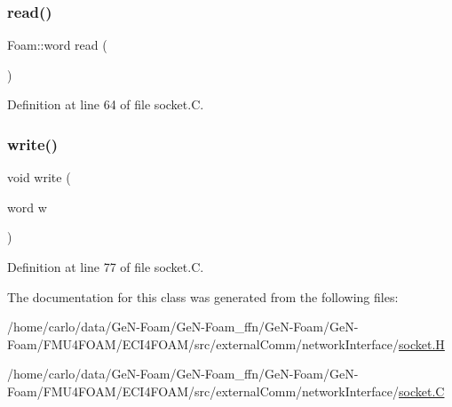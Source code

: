 \subsubsection{\texorpdfstring{read()}{read()}}
{\footnotesize\ttfamily Foam\+::word read (\begin{DoxyParamCaption}{ }\end{DoxyParamCaption})}



Definition at line 64 of file socket.\+C.

\mbox{\label{classFoam_1_1socket_a5abf104fabb38aa7c80721483091cf0b}} 
\subsubsection{\texorpdfstring{write()}{write()}}
{\footnotesize\ttfamily void write (\begin{DoxyParamCaption}\item[{word}]{w }\end{DoxyParamCaption})}



Definition at line 77 of file socket.\+C.



The documentation for this class was generated from the following files\+:\begin{DoxyCompactItemize}
\item 
/home/carlo/data/\+Ge\+N-\/\+Foam/\+Ge\+N-\/\+Foam\+\_\+ffn/\+Ge\+N-\/\+Foam/\+Ge\+N-\/\+Foam/\+F\+M\+U4\+F\+O\+A\+M/\+E\+C\+I4\+F\+O\+A\+M/src/external\+Comm/network\+Interface/\hyperlink{socket_8H}{socket.\+H}\item 
/home/carlo/data/\+Ge\+N-\/\+Foam/\+Ge\+N-\/\+Foam\+\_\+ffn/\+Ge\+N-\/\+Foam/\+Ge\+N-\/\+Foam/\+F\+M\+U4\+F\+O\+A\+M/\+E\+C\+I4\+F\+O\+A\+M/src/external\+Comm/network\+Interface/\hyperlink{socket_8C}{socket.\+C}\end{DoxyCompactItemize}
